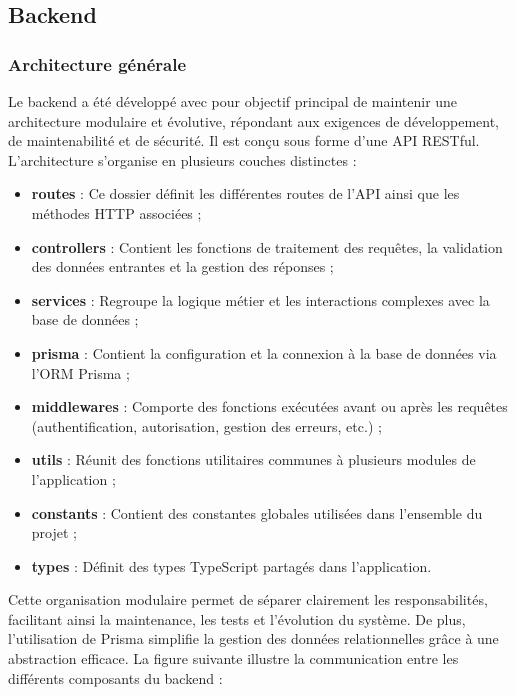 \subsection{Backend}
\subsubsection{Architecture générale}

Le backend a été développé avec pour objectif principal de maintenir une architecture modulaire et évolutive, répondant aux exigences de développement, de maintenabilité et de sécurité. Il est conçu sous forme d'une API RESTful. L’architecture s’organise en plusieurs couches distinctes :

\begin{itemize}
  \item \textbf{routes} : Ce dossier définit les différentes routes de l'API ainsi que les méthodes HTTP associées ;
  \item \textbf{controllers} : Contient les fonctions de traitement des requêtes, la validation des données entrantes et la gestion des réponses ;
  \item \textbf{services} : Regroupe la logique métier et les interactions complexes avec la base de données ;
  \item \textbf{prisma} : Contient la configuration et la connexion à la base de données via l’ORM Prisma ;
  \item \textbf{middlewares} : Comporte des fonctions exécutées avant ou après les requêtes (authentification, autorisation, gestion des erreurs, etc.) ;
  \item \textbf{utils} : Réunit des fonctions utilitaires communes à plusieurs modules de l’application ;
  \item \textbf{constants} : Contient des constantes globales utilisées dans l’ensemble du projet ;
  \item \textbf{types} : Définit des types TypeScript partagés dans l'application.
\end{itemize}

Cette organisation modulaire permet de séparer clairement les responsabilités, facilitant ainsi la maintenance, les tests et l'évolution du système. De plus, l’utilisation de Prisma simplifie la gestion des données relationnelles grâce à une abstraction efficace. La figure suivante illustre la communication entre les différents composants du backend :

